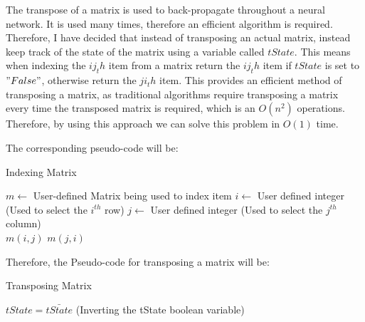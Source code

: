 The transpose of a matrix is used to back-propagate throughout a neural network. It is used many times, therefore an efficient algorithm is required. Therefore, I have decided that instead of transposing an actual matrix, instead keep track of the state of the matrix using a variable called $tState$. This means when indexing the $ij_th$ item from a matrix return the $ij_th$ item if $tState$ is set to $"False"$, otherwise return the $ji_th$ item. This provides an efficient method of transposing a matrix, as traditional algorithms require transposing a matrix every time the transposed matrix is required, which is an $O(n^2)$ operations. Therefore, by using this approach we can solve this problem in $O(1)$ time.

The corresponding pseudo-code will be:
\begin{algorithm}[H]
\caption{Indexing Matrix}\label{IndexingMatrix}
\begin{algorithmic}[1]
\State $m \gets$ User-defined Matrix being used to index item
\State $i \gets $ User defined integer (Used to select the $i^{th}$ row)
\State $j \gets $ User defined integer (Used to select the $j^{th}$ column)
\\
\State \Return $m(i,j)$
\Else
\State \Return $m(j,i)$    
\EndIf
\end{algorithmic}
\end{algorithm}

Therefore, the Pseudo-code for transposing a matrix will be:
\begin{algorithm}[H]
\caption{Transposing Matrix}\label{TransposingMatrix}
\begin{algorithmic}[1]
\State $tState = \bar{tState}$ (Inverting the tState boolean variable)
\end{algorithmic}
\end{algorithm}